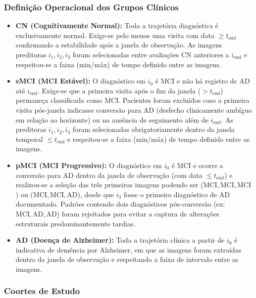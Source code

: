 \documentclass[review]{elsarticle}
\begin{document}
	\subsubsection{Definição Operacional dos Grupos Clínicos}
	
	\begin{itemize}
		\item \textbf{CN (Cognitivamente Normal):} Toda a trajetória diagnóstica é exclusivamente normal. Exige-se pelo menos uma visita com data $\ge t_{\mathrm{end}}$ confirmando a estabilidade após a janela de observação. As imagens preditoras $i_1, i_2, i_3$ foram selecionadas entre avaliações CN anteriores a $i_{\mathrm{end}}$ e respeitou-se a faixa (min/máx) de tempo definido entre as imagens.
		
		\item \textbf{sMCI (MCI Estável):} O diagnóstico em $i_0$ é MCI e não há registro de AD até $i_{\mathrm{end}}$. Exige-se que a primeira visita após o fim da janela ($> t_{\mathrm{end}}$) permaneça classificada como MCI. Pacientes foram excluídos caso a primeira visita pós-janela indicasse conversão para AD (desfecho clinicamente ambíguo em relação ao horizonte) ou na ausência de seguimento além de $i_{\mathrm{end}}$. As preditoras $i_1, i_2, i_3$ foram selecionadas obrigatoriamente dentro da janela temporal $\le t_{\mathrm{end}}$ e respeitou-se a faixa (min/máx) de tempo definido entre as imagens.
		
		\item \textbf{pMCI (MCI Progressivo):} O diagnóstico em $i_0$ é MCI e ocorre a conversão para AD dentro da janela de observação (com data $\le t_{\mathrm{end}}$) e realizou-se a seleção das três primeiras imagens podendo ser ($\mathrm{MCI}, \mathrm{MCI}, \mathrm{MCI}$) ou ($\mathrm{MCI}, \mathrm{MCI}, \mathrm{AD}$), desde que $i_3$ fosse o primeiro diagnóstico de AD documentado. Padrões contendo dois diagnósticos pós-conversão (ex: $\mathrm{MCI}, \mathrm{AD}, \mathrm{AD}$) foram rejeitados para evitar a captura de alterações estruturais predominantemente tardias.
		
		\item \textbf{AD (Doença de Alzheimer):} Toda a trajetória clínica a partir de $i_0$ é indicativa de demência por Alzheimer, em que as imagens foram extraídas dentro da janela de observação e respeitando a faixa de intervalo entre as imagens.
	\end{itemize}
	
	\subsubsection{Coortes de Estudo}\label{subsubsec:cohorts}
	
\end{document}
